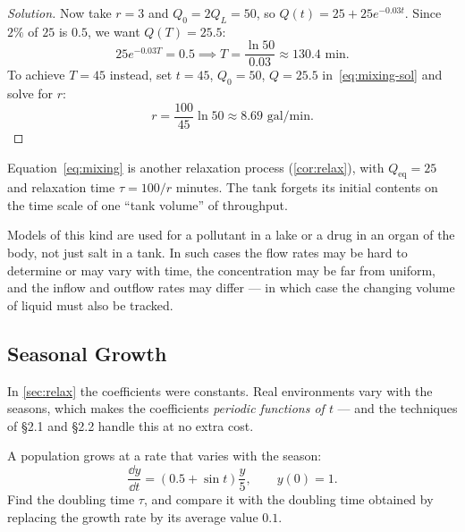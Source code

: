 \begin{proof}[Solution]
	Now take \(r = 3\) and \(Q_0 = 2Q_L = 50\), so \(Q(t) = 25 + 25e^{-0.03t}\). Since
	\(2\%\) of \(25\) is \(0.5\), we want \(Q(T) = 25.5\):
	\[
		25e^{-0.03T} = 0.5 \implies T = \frac{\ln 50}{0.03} \approx 130.4 \text{ min}.
	\]
	To achieve \(T = 45\) instead, set \(t = 45\), \(Q_0 = 50\), \(Q = 25.5\)
	in~\eqref{eq:mixing-sol} and solve for \(r\):
	\[
		r = \frac{100}{45}\ln 50 \approx 8.69 \text{ gal/min}.
	\]
\end{proof}

\begin{observation}
	Equation~\eqref{eq:mixing} is another relaxation process (\autoref{cor:relax}), with
	\(Q_{\mathrm{eq}} = 25\) and relaxation time \(\tau = 100/r\) minutes. The tank
	forgets its initial contents on the time scale of one ``tank volume'' of throughput.
\end{observation}

\begin{remark}
	Models of this kind are used for a pollutant in a lake or a drug in an organ of the
	body, not just salt in a tank. In such cases the flow rates may be hard to determine
	or may vary with time, the concentration may be far from uniform, and the inflow and
	outflow rates may differ --- in which case the changing volume of liquid must also be
	tracked.
\end{remark}

\subsection{Seasonal Growth}

In \autoref{sec:relax} the coefficients were constants. Real environments vary with the
seasons, which makes the coefficients \emph{periodic functions of \(t\)} --- and the
techniques of §2.1 and §2.2 handle this at no extra cost.

\begin{eg}
	A population grows at a rate that varies with the season:
	\begin{equation}\label{eq:seasonal}
		\frac{\dd y}{\dd t} = \left( 0.5 + \sin t \right) \frac{y}{5},
		\qquad y(0) = 1.
	\end{equation}
	Find the doubling time \(\tau\), and compare it with the doubling time obtained by
	replacing the growth rate by its average value \(0.1\).
\end{eg}

